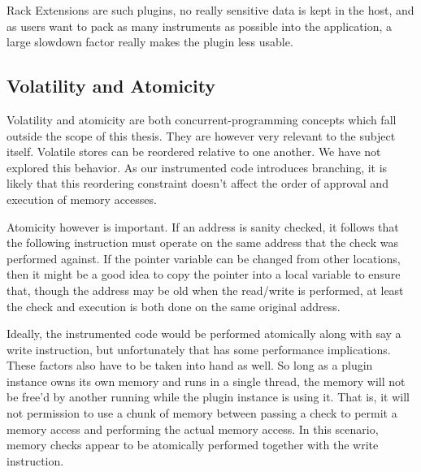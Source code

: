 Rack Extensions are such plugins, no really sensitive data is kept in the host,
and as users want to pack as many instruments as possible into the application,
a large slowdown factor really makes the plugin less usable.

\subsection {Volatility and Atomicity}

Volatility and atomicity are both concurrent-programming concepts which fall
outside the scope of this thesis. They are however very relevant to the subject
itself. Volatile stores can be reordered relative to one another. We have not
explored this behavior. As our instrumented code introduces branching, it is
likely that this reordering constraint doesn't affect the order of approval and
execution of memory accesses.

Atomicity however is important. If an address is sanity checked, it follows that
the following instruction must operate on the same address that the check was
performed against. If the pointer variable can be changed from other locations,
then it might be a good idea to copy the pointer into a local variable to ensure
that, though the address may be old when the read/write is performed, at least
the check and execution is both done on the same original address.

Ideally, the instrumented code would be performed atomically along with say a
write instruction, but unfortunately that has some performance implications.
These factors also have to be taken into hand as well. So long as a plugin
instance owns its own memory and runs in a single thread, the memory will not be
free'd by another running while the plugin instance is using it. That is, it
will not permission to use a chunk of memory between passing a check to permit a
memory access and performing the actual memory access. In this scenario, memory
checks appear to be atomically performed together with the write instruction.
